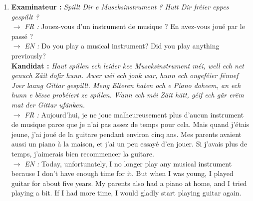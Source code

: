 \begin{enumerate}
    \item \textbf{Examinateur :} \textit{Spillt Dir e Museksinstrument ? Hutt Dir fréier eppes gespillt ?} \\
    $\rightarrow$ \textit{FR :} Jouez-vous d'un instrument de musique ? En avez-vous joué par le passé ? \\
    $\rightarrow$ \textit{EN :} Do you play a musical instrument? Did you play anything previously? \\
    \textbf{Kandidat :} \textit{Haut spillen ech leider kee Museksinstrument méi, well ech net genuch Zäit dofir hunn. Awer wéi ech jonk war, hunn ech ongeféier fënnef Joer laang Gittar gespillt. Meng Elteren haten och e Piano doheem, an ech hunn e bësse probéiert ze spillen. Wann ech méi Zäit hätt, géif ech gär erëm mat der Gittar ufänken.} \\
    $\rightarrow$ \textit{FR :} Aujourd'hui, je ne joue malheureusement plus d'aucun instrument de musique parce que je n'ai pas assez de temps pour cela. Mais quand j'étais jeune, j'ai joué de la guitare pendant environ cinq ans. Mes parents avaient aussi un piano à la maison, et j'ai un peu essayé d'en jouer. Si j'avais plus de temps, j'aimerais bien recommencer la guitare. \\
    $\rightarrow$ \textit{EN :} Today, unfortunately, I no longer play any musical instrument because I don't have enough time for it. But when I was young, I played guitar for about five years. My parents also had a piano at home, and I tried playing a bit. If I had more time, I would gladly start playing guitar again.

    \vspace{0.4em}


\end{enumerate}
